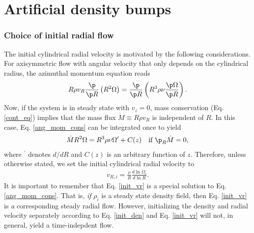 \section{Artificial density bumps}\label{density_bump}




\subsubsection{Choice of initial radial flow}
The initial cylindrical radial velocity is motivated by the following
considerations. For axisymmetric flow with angular velocity that only
depends on the cylindrical radius, the azimuthal momentum equation reads
\begin{align}\label{ang_mom_cons}
  R\rho v_R\frac{\p}{\p R}\left(R^2\Omega \right) = \frac{\p}{\p
    R}\left(R^3\rho\nu\frac{\p\Omega}{\p R}\right). 
\end{align}
Now, if the system is in steady state with $v_z=0$, mass
conservation (Eq. \ref{cont_eq}) implies that the mass flux  
$\dot{M}\equiv R\rho v_R$ is independent of $R$. In this case,
Eq. \ref{ang_mom_cons} can 
be integrated once to yield 
\begin{align*}
  \dot{M}R^2\Omega = R^3\rho\nu\Omega^\prime + C(z) \quad \text{if $\p_R\dot{M}$} = 0, 
\end{align*}
where $^\prime$ denotes $d/dR$ and $C(z)$ is an arbitrary function of
$z$. Therefore, unless otherwise stated, we set the initial
cylindrical radial velocity to  
\begin{align}\label{init_vr} 
  v_{R,i} = \frac{\nu}{R}\frac{d\ln{\Omega_i}}{d\ln{R}}. 
\end{align}
It is important to remember that Eq. \ref{init_vr} is a special
solution to Eq. \ref{ang_mom_cons}. That is, \emph{if} $\rho_i$ is a
steady state density field, then Eq. \ref{init_vr} is \emph{a} corresponding
steady radial flow. However, initializing the density and radial velocity
separately according to Eq. \ref{init_den} and Eq. \ref{init_vr} 
will not, in general, yield a time-indepdent flow. 


